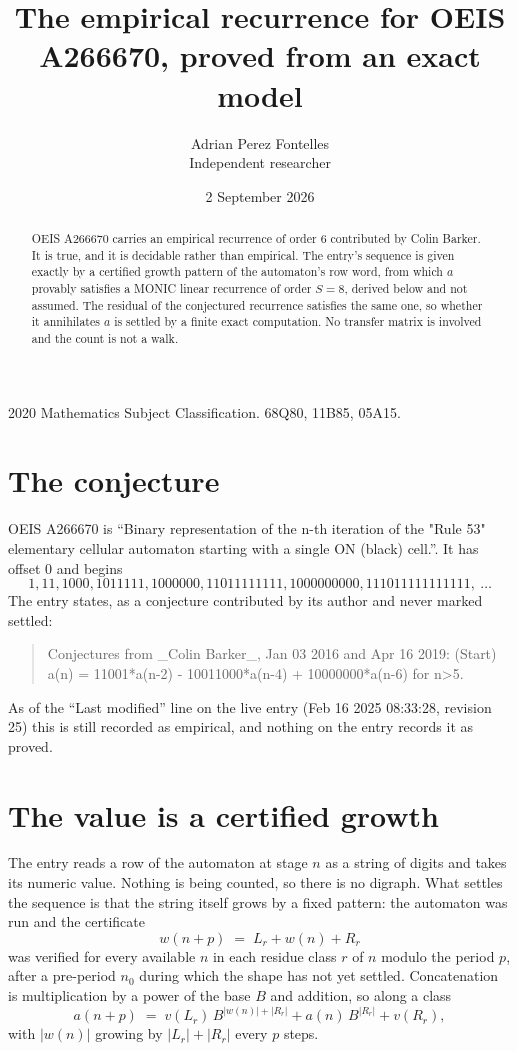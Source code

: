 \documentclass[11pt,a4paper]{article}
\title{The empirical recurrence for OEIS A266670, proved from an exact model}
\author{Adrian Perez Fontelles\\ \small Independent researcher}
\date{2 September 2026}
\theoremstyle{plain}
\theoremstyle{definition}
\begin{document}
\maketitle

\begin{abstract}
OEIS A266670 carries an empirical recurrence of order $6$ contributed by Colin Barker. It is true, and it is
decidable rather than empirical. The entry's sequence is given exactly by a certified growth pattern of the automaton's row word, from
which $a$ provably satisfies a MONIC linear recurrence of order $S=8$, derived below and not
assumed. The residual of the conjectured recurrence satisfies the same one, so whether it
annihilates $a$ is settled by a finite exact computation. No transfer matrix is involved and
the count is not a walk.
\end{abstract}

\noindent\small 2020 Mathematics Subject Classification. 68Q80, 11B85, 05A15.\normalsize

\section{The conjecture}

OEIS A266670 is ``Binary representation of the n-th iteration of the "Rule 53" elementary cellular automaton starting with a single ON (black) cell.''. It has offset $0$ and begins
\[
1, 11, 1000, 1011111, 1000000, 11011111111, 1000000000, 111011111111111,\ \dots
\]
The entry states, as a conjecture contributed by its author and never marked settled:
\begin{quote}
Conjectures from \_Colin Barker\_, Jan 03 2016 and Apr 16 2019: (Start) a(n) = 11001*a(n-2) - 10011000*a(n-4) + 10000000*a(n-6) for n>5.
\end{quote}
As of the ``Last modified'' line on the live entry (Feb 16 2025 08:33:28, revision 25)
this is still recorded as empirical, and nothing on the entry records it as proved.

\section{The value is a certified growth}

The entry reads a row of the automaton at stage $n$ as a string of digits and takes its
numeric value. Nothing is being counted, so there is no digraph. What settles the sequence is
that the string itself grows by a fixed pattern: the automaton was run and the certificate
\[
w(n+p)\;=\;L_r + w(n) + R_r
\]
was verified for every available $n$ in each residue class $r$ of $n$ modulo the period $p$,
after a pre-period $n_0$ during which the shape has not yet settled. Concatenation is
multiplication by a power of the base $B$ and addition, so along a class
\[
a(n+p)\;=\;v(L_r)\,B^{|w(n)|+|R_r|} + a(n)\,B^{|R_r|} + v(R_r),
\]
with $|w(n)|$ growing by $|L_r|+|R_r|$ every $p$ steps.
\end{document}
